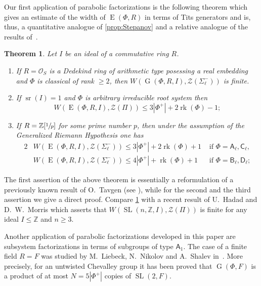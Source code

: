 \documentclass[12pt]{amsart}
\theoremstyle{plain}
\newtheorem{thm}{Theorem}
\numberwithin{equation}{section}
\numberwithin{lemma}{section}
\theoremstyle{definition}
\theoremstyle{remark}
\DeclareMathOperator{\G}{G}
\DeclareMathOperator{\SL}{SL}
\DeclareMathOperator{\E}{E}
\DeclareMathOperator{\sr}{sr}
\DeclareMathOperator{\rk}{rk}
\newcommand{\rA}{\mathsf{A}}
\newcommand{\rB}{\mathsf{B}}
\newcommand{\rC}{\mathsf{C}}
\newcommand{\rD}{\mathsf{D}}
\begin{document}

Our first application of parabolic factorizations is the following theorem which gives an estimate of the width of $\E(\Phi, R)$ in terms of Tits generators and is, thus, a quantitative analogue of \cref{prop:Stepanov}
and a relative analogue of the results of~\cite{CK83, Tavgen91, Mo07, VseUnitrZ1p, VavSmSuUnitrEng}.
\begin{thm}\label{thm:width} Let $I$ be an ideal of a commutative ring $R$.
\begin{enumerate}
\item If $R=\mathcal{O}_S$ is a Dedekind ring of arithmetic type posessing a real embedding and $\Phi$ is classical of rank $\geqslant2$, then 
$W(\G(\Phi, R, I), \mathcal{Z}(\Sigma_\ell^-))$ is finite.
\item If $\sr(I) = 1$ and $\Phi$ is arbitrary irreducible root system then 
\[W(\E(\Phi, R, I), \mathcal{Z}(\Pi))\leqslant 3|\Phi^+|+2\rk(\Phi)-1;\]
\item If $R = \mathbb{Z}[\sfrac{1}{p}]$ for some prime number $p$, then under the assumption of the Generalized Riemann Hypothesis one has
\begin{alignat*}{2}
& W(\E(\Phi, R, I), \mathcal{Z}(\Sigma_\ell^-))\leqslant 3|\Phi^+| + 2\rk(\Phi) + 1 & \text{ if } \Phi=\rA_\ell, \rC_\ell, \\
& W(\E(\Phi, R, I), \mathcal{Z}(\Sigma_\ell^-))\leqslant 4|\Phi^+| + \rk(\Phi) + 1 & \text{ if } \Phi=\rB_\ell, \rD_\ell;
\end{alignat*}
\end{enumerate}
\end{thm}
The first assertion of the above theorem is essentially a reformulation of a previously known result of O.~Tavgen (see \cite{TavgenThesis}), 
while for the second and the third assertion we give a direct proof.
Compare \cref{thm:width} with a recent result of U.~Hadad and D.~W.~Morris \cite[Theorem~1.6]{Ha12} which asserts that 
$W(\SL(n, \mathbb{Z}, I), \mathcal{Z}(\Pi))$ is finite for any ideal $I \leq \mathbb{Z}$ and $n \geq 3$.

Another application of parabolic factorizations developed in this paper are subsystem factorizations in terms of subgroups of type $\rA_1$.
The case of a finite field $R=F$ was studied by M.~Liebeck, N.~Nikolov and A.~Shalev in~\cite{LiebNikShaSL2}.
More precisely, for an untwisted Chevalley group it has been proved that $\G(\Phi, F)$ is a product of at most $N=5|\Phi^+|$ copies of $\SL(2, F)$.
\end{document}
